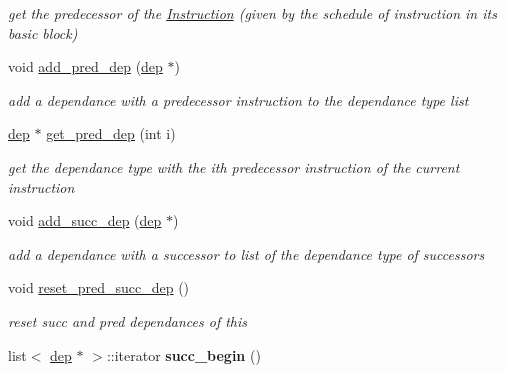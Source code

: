 \begin{DoxyCompactItemize}
\begin{DoxyCompactList}\small\item\em get the predecessor of the \hyperlink{class_instruction}{Instruction} (given by the schedule of instruction in its basic block) \end{DoxyCompactList}\item 
\hypertarget{class_instruction_a3121dad231e2b4c27ac3cae6c8627ece}{}void \hyperlink{class_instruction_a3121dad231e2b4c27ac3cae6c8627ece}{add\+\_\+pred\+\_\+dep} (\hyperlink{structdep}{dep} $\ast$)\label{class_instruction_a3121dad231e2b4c27ac3cae6c8627ece}

\begin{DoxyCompactList}\small\item\em add a dependance with a predecessor instruction to the dependance type list \end{DoxyCompactList}\item 
\hypertarget{class_instruction_ab32531f8dd490b1c8396b6723f87bfae}{}\hyperlink{structdep}{dep} $\ast$ \hyperlink{class_instruction_ab32531f8dd490b1c8396b6723f87bfae}{get\+\_\+pred\+\_\+dep} (int i)\label{class_instruction_ab32531f8dd490b1c8396b6723f87bfae}

\begin{DoxyCompactList}\small\item\em get the dependance type with the ith predecessor instruction of the current instruction \end{DoxyCompactList}\item 
\hypertarget{class_instruction_acefc258dbcf45c19136dc86e47a82c0e}{}void \hyperlink{class_instruction_acefc258dbcf45c19136dc86e47a82c0e}{add\+\_\+succ\+\_\+dep} (\hyperlink{structdep}{dep} $\ast$)\label{class_instruction_acefc258dbcf45c19136dc86e47a82c0e}

\begin{DoxyCompactList}\small\item\em add a dependance with a successor to list of the dependance type of successors \end{DoxyCompactList}\item 
\hypertarget{class_instruction_a786e43bcd16d16a4db7c8a665c4d68af}{}void \hyperlink{class_instruction_a786e43bcd16d16a4db7c8a665c4d68af}{reset\+\_\+pred\+\_\+succ\+\_\+dep} ()\label{class_instruction_a786e43bcd16d16a4db7c8a665c4d68af}

\begin{DoxyCompactList}\small\item\em reset succ and pred dependances of this \end{DoxyCompactList}\item 
\hypertarget{class_instruction_a2c6f13ddda889e4e2b8b69897de6b733}{}list$<$ \hyperlink{structdep}{dep} $\ast$ $>$\+::iterator {\bfseries succ\+\_\+begin} ()\label{class_instruction_a2c6f13ddda889e4e2b8b69897de6b733}


\end{DoxyCompactItemize}
